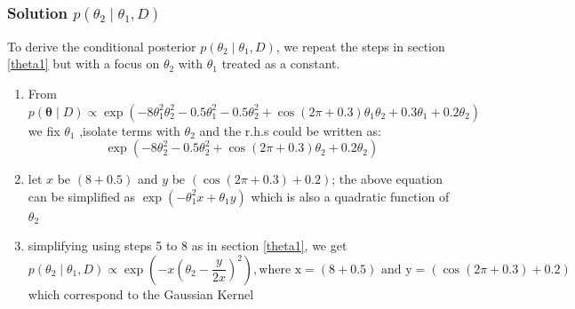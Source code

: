 \documentclass[12pt]{article}
\begin{document}
\subsubsection{Solution \(p(\theta_2 \mid \theta_1, D)\) }
To derive the conditional posterior \(p(\theta_2 \mid \theta_1, D)\), we repeat the steps in section \ref{theta1} but with a focus on $\theta_2$ with $\theta_1$ treated as a constant.

\begin{enumerate}
    \item From
$p(\boldsymbol{\theta} \mid D) \propto \exp\left(-8\theta_1^2\theta_2^2 - 0.5\theta_1^2 - 0.5\theta_2^2 + \cos(2\pi + 0.3)\theta_1\theta_2 + 0.3\theta_1 + 0.2\theta_2 \right)$ we fix $\theta_1$ ,isolate terms with $\theta_2$ and the r.h.s could be written as:
\[\exp\left(-8\theta_2^2 - 0.5\theta_2^2 + \cos(2\pi + 0.3)\theta_2 + 0.2\theta_2 \right)\]
    \item let $x$ be $\left(8 +0.5\right)$ and $y$ be $\left(\cos(2\pi + 0.3)+ 0.2\right)$; the above equation can be simplified as $\exp\left(-\theta_1^2x+ \theta_1y\right)$ which is also a quadratic function of $\theta_2$
    \item simplifying using steps 5 to 8 as in section \ref{theta1}, we get
    \[ p(\theta_2 \mid \theta_1, D) \propto \exp\left(-x\left(\theta_2 - \frac{y}{2x}\right)^2\right), \text {where x} =\left(8 +0.5\right) \text { and y} = \left(\cos(2\pi + 0.3)+ 0.2\right)\] 
    which correspond to the Gaussian Kernel
\end{enumerate}
\end{document}
